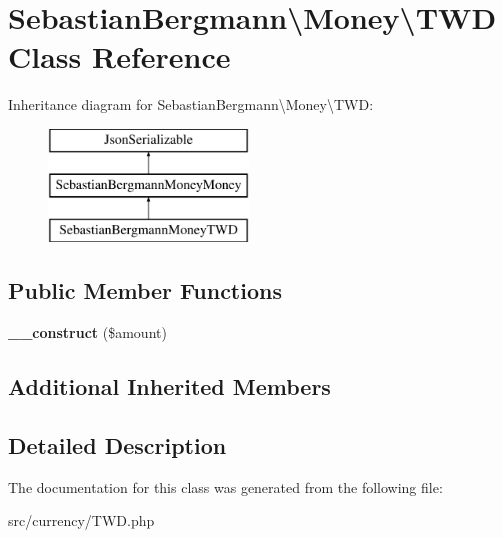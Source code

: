 \hypertarget{classSebastianBergmann_1_1Money_1_1TWD}{}\section{Sebastian\+Bergmann\textbackslash{}Money\textbackslash{}T\+W\+D Class Reference}
\label{classSebastianBergmann_1_1Money_1_1TWD}
Inheritance diagram for Sebastian\+Bergmann\textbackslash{}Money\textbackslash{}T\+W\+D\+:\begin{figure}[H]
\begin{center}
\leavevmode
\includegraphics[height=3.000000cm]{classSebastianBergmann_1_1Money_1_1TWD}
\end{center}
\end{figure}
\subsection*{Public Member Functions}
\begin{DoxyCompactItemize}
\item 
\hypertarget{classSebastianBergmann_1_1Money_1_1TWD_ae7d0b49006077bb886817dcb4551bca9}{}{\bfseries \+\_\+\+\_\+construct} (\$amount)\label{classSebastianBergmann_1_1Money_1_1TWD_ae7d0b49006077bb886817dcb4551bca9}

\end{DoxyCompactItemize}
\subsection*{Additional Inherited Members}


\subsection{Detailed Description}


The documentation for this class was generated from the following file\+:\begin{DoxyCompactItemize}
\item 
src/currency/T\+W\+D.\+php\end{DoxyCompactItemize}
